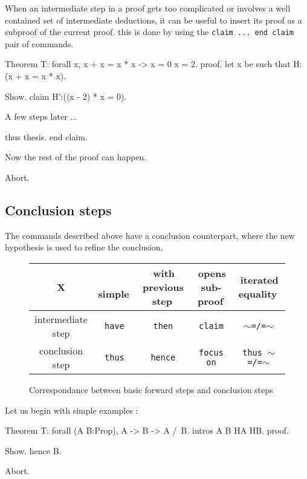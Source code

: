 When an intermediate step in a proof gets too complicated or involves a well contained set of intermediate deductions, it can be useful to insert its proof as a subproof of the current proof. this is done by using the {\tt claim ... end claim} pair of commands. 

\begin{coq_eval}
Theorem T: forall x, x + x = x * x -> x = 0 \/ x = 2.
proof.
let x be such that H:(x + x = x * x).
\end{coq_eval} 
\begin{coq_example}
Show.
claim H':((x - 2) * x = 0).
\end{coq_example}

A few steps later ...

\begin{coq_example}
thus thesis. 
end claim.
\end{coq_example}

Now the rest of the proof can happen.

\begin{coq_eval}
Abort.
\end{coq_eval}

\subsection{Conclusion steps}

The commands described above have a conclusion counterpart, where the
new hypothesis is used to refine the conclusion.

\begin{figure}[b]
 \centering
\begin{tabular}{c|c|c|c|c|}
        X       & \,simple\, & \,with previous step\, & 
               \,opens sub-proof\, & \,iterated equality\, \\
\hline
intermediate step & {\tt have} & {\tt then} & 
               {\tt claim} & {\tt $\sim$=/=$\sim$}\\ 
conclusion step & {\tt thus} & {\tt hence} & 
                {\tt focus on} & {\tt thus $\sim$=/=$\sim$}\\ 
\hline
\end{tabular}
\caption{Correspondance between basic forward steps and conclusion steps}
\end{figure}

Let us begin with simple examples :

\begin{coq_eval}
Theorem T: forall (A B:Prop), A -> B -> A /\ B.
intros A B HA HB.
proof.
\end{coq_eval} 
\begin{coq_example}
Show.
hence B.
\end{coq_example}
\begin{coq_eval}
Abort.
\end{coq_eval}

